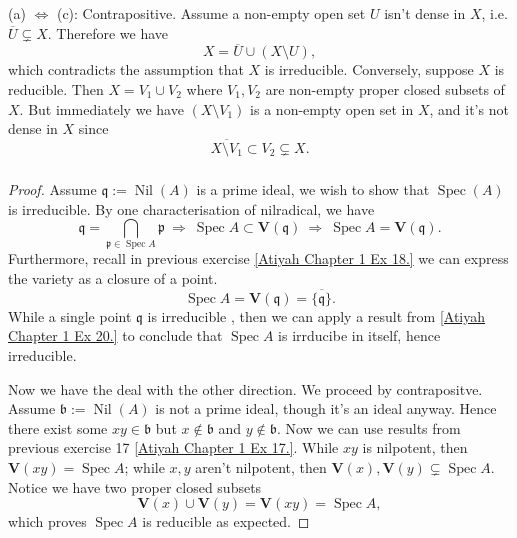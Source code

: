 (a) $\Leftrightarrow$ (c): Contrapositive. Assume a non-empty open set $U$ isn't dense in $X$, i.e. $\overline{U}\subsetneq X$. Therefore we have $$X=\overline{U}\cup (X\setminus U),$$ which contradicts the assumption that $X$ is irreducible. Conversely, suppose $X$ is reducible. Then $X=V_1\cup V_2$ where $V_1,V_2$ are non-empty proper closed subsets of $X$. But immediately we have $(X\setminus V_1)$ is a non-empty open set in $X$, and it's not dense in $X$ since 
$$\overline{X\setminus V_1}\subset V_2\subsetneq X.$$

\subsubsection{}

\begin{proof}
    Assume $\mathfrak q:=\operatorname{Nil}(A)$ is a prime ideal, we wish to show that $\operatorname{Spec}(A)$ is irreducible. By one characterisation of nilradical, we have 
    $$\mathfrak q=\bigcap_{\mathfrak p\in\operatorname{Spec}A}\mathfrak p ~\Rightarrow~ \operatorname{Spec}A\subset \mathbf V(\mathfrak q)~\Rightarrow~ \operatorname{Spec}A= \mathbf V(\mathfrak q).$$
    Furthermore, recall in previous exercise \ref{Atiyah Chapter 1 Ex 18.} we can express the variety as a closure of a point.
    $$\operatorname{Spec}A=\mathbf V(\mathfrak q)=\overline{\{\mathfrak q\}}.$$
    While a single point $\mathfrak q$ is irreducible , then we can apply a result from \ref{Atiyah Chapter 1 Ex 20.} to conclude that $\operatorname{Spec}A$ is irrducibe in itself, hence irreducible.

    Now we have the deal with the other direction. We proceed by contrapositve. Assume $\mathfrak b:=\operatorname{Nil}(A)$ is not a prime ideal, though it's an ideal anyway. Hence there exist some $xy\in \mathfrak b$ but $x\notin \mathfrak b$ and $y\notin \mathfrak b$. 
    Now we can use results from previous exercise 17 \ref{Atiyah Chapter 1 Ex 17.}. While $xy$ is nilpotent, then $\mathbf V(xy)=\operatorname{Spec} A$; while $x,y$ aren't nilpotent, then $\mathbf V(x),\mathbf V(y)\subsetneq \operatorname{Spec}A$. Notice we have two proper closed subsets
    $$\mathbf V(x)\cup\mathbf V(y)=\mathbf V(xy)=\operatorname{Spec} A,$$which proves $\operatorname{Spec}A$ is reducible as expected.
\end{proof}

